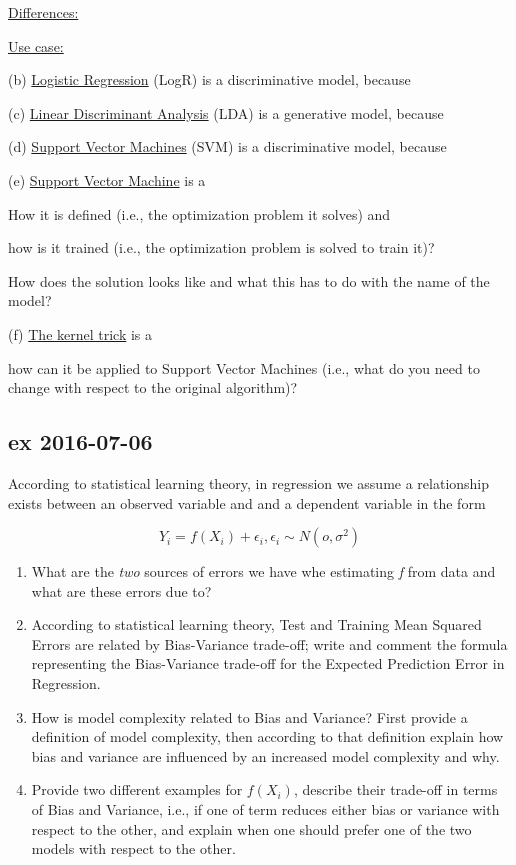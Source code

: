 \documentclass[a4paper,12pt,titlepage]{article} %
\begin{document}
\underline{Differences:}

\underline{Use case:}


(b) \underline{Logistic Regression} (LogR) is a discriminative model, because 


(c) \underline{Linear Discriminant Analysis} (LDA) is a generative model, because


(d) \underline{Support Vector Machines} (SVM) is a discriminative model, because 

(e) \underline{Support Vector Machine} is a

How it is defined (i.e., the optimization problem it solves) and 

how is it trained (i.e., the optimization problem is solved to train it)? 

How does the solution looks like and what this has to do with the name of the model?

(f) \underline{The kernel trick} is a

how can it be applied to Support Vector Machines (i.e., what do you need to change with respect to the original algorithm)?


\newpage
\subsection{ex 2016-07-06}
According to statistical learning theory, in regression we assume a relationship exists between an observed variable and and a dependent variable in the form 

$$ Y_{i} = f(X_{i}) + \epsilon_{i}, \epsilon_{i} \sim N(o, \sigma^{2})$$

\begin{enumerate}
\item What are the \textit{two} sources of errors we have whe estimating \textit{f} from data and what are these errors due to?
\item According to statistical learning theory, Test and Training Mean Squared Errors are related by Bias-Variance trade-off; write and comment the formula representing the Bias-Variance trade-off for the Expected Prediction Error in Regression.
\item How is model complexity related to Bias and Variance? First provide a definition of model complexity, then according to that definition explain how bias and variance are influenced by an increased model complexity and why.
\item Provide two different examples for $ f(X_{i}) $, describe their trade-off in terms of Bias and Variance, i.e., if one of term reduces either bias or variance with respect to the other, and explain when one should prefer one of the two models with respect to the other.
\end{enumerate}
\end{document}

